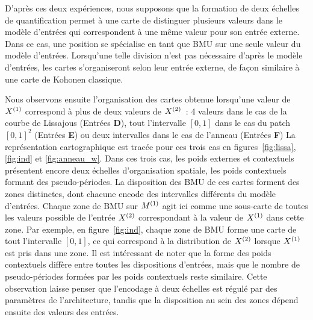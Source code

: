\documentclass[../main]{subfiles}
\begin{document}
D'après ces deux expériences, nous supposons que la formation de deux échelles de quantification permet à une carte de distinguer plusieurs valeurs dans le modèle d'entrées qui correspondent à une même valeur pour son entrée externe. Dans ce cas, une position se spécialise en tant que BMU sur une seule valeur du modèle d'entrées.
Lorsqu'une telle division n'est pas nécessaire d'après le modèle d'entrées, les cartes s'organiseront selon leur entrée externe, de façon similaire à une carte de Kohonen classique.


Nous observons ensuite l'organisation des cartes obtenue lorsqu'une valeur de $X^{({1})}$ correspond à plus de deux valeurs de $X^{({2})}$~: 4 valeurs dans le cas de la courbe de Lissajous (Entrées \textbf{D}), tout l'intervalle $[0,1]$ dans le cas du patch $[0,1]^2$ (Entrées \textbf{E}) ou deux intervalles dans le cas de l'anneau (Entrées \textbf{F})
La représentation cartographique est tracée pour ces trois cas en figures~\ref{fig:lissa}, \ref{fig:ind} et \ref{fig:anneau_w}.
Dans ces trois cas, les poids externes et contextuels présentent encore deux échelles d'organisation spatiale, les poids contextuels formant des pseudo-périodes.
La disposition des BMU de ces cartes forment des zones distinctes, dont chacune encode des intervalles différents du modèle d'entrées. 
Chaque zone de BMU sur $M^{({1})}$ agit ici comme une sous-carte de toutes les valeurs possible de l'entrée $X^{({2})}$ correspondant à la valeur de $X^{({1})}$ dans cette zone.
Par exemple, en figure~\ref{fig:ind}, chaque zone de BMU forme une carte de tout l'intervalle $[0,1]$, ce qui correspond à la distribution de $X^{({2})}$ lorsque $X^{({1})}$ est pris dans une zone.
Il est intéressant de noter que la forme des poids contextuels diffère entre toutes les dispositions d'entrées, mais que le nombre de pseudo-périodes formées par les poids contextuels reste similaire. Cette observation laisse penser que l'encodage à deux échelles est régulé par des paramètres de l'architecture, tandis que la disposition au sein des zones dépend ensuite des valeurs des entrées.
\end{document}
